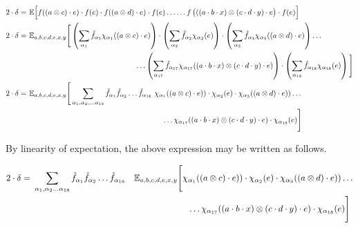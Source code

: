 \documentclass[11pt]{article}
\newcommand{\eat}[1]{}
\begin{document}
\begin{align*}
  2 \cdot \delta = &\ \mathbb{E}\Big[ f((a\otimes c) \cdot e) \cdot f(e) \cdot f((a \otimes d) \cdot e) \cdot f(e) \ldots \ldots  \eat{\\ & \ldots  f\left(\left((a \cdot b \cdot x) \otimes c\right) \cdot e\right) \cdot f(e) \cdot f\left(((a \cdot b \cdot x) \otimes d \cdot e)\right) \cdot f(e) \cdot} f\left(((a \cdot b \cdot x) \otimes (c \cdot d \cdot y) \cdot e\right) \cdot f(e) \Big]\\
  2 \cdot \delta = & \ \mathbb{E}_{a,b,c,d,e,x,y}\Bigg[ \left(\sum_{\alpha_1} \hat{f}_{\alpha_1}\chi_{\alpha_1}((a \otimes c) \cdot e) \right) \cdot \left(\sum_{\alpha_2}\hat{f}_{\alpha_2} \chi_{\alpha_2}(e) \right) \cdot \left(\sum_{\alpha_3} \hat{f}_{\alpha_3}\chi_{\alpha_3}((a \otimes d) \cdot e) \right) \ldots \\ & \hspace*{2in}\ldots \left(\sum_{\alpha_{17}} \hat{f}_{\alpha_{17}}\chi_{\alpha_{17}}((a \cdot b \cdot x) \otimes (c \cdot d \cdot y) \cdot e)\right) \cdot \left(\sum_{\alpha_{18}}\hat{f}_{\alpha_{18}} \chi_{\alpha_{18}}(e) \right)\Bigg]\\
  2 \cdot \delta = & \ \mathbb{E}_{a,b,c,d,e,x,y}\Bigg[\sum_{\alpha_1, \alpha_2, \ldots \alpha_{18}} \hat{f}_{\alpha_1} \hat{f}_{\alpha_2} \ldots \hat{f}_{\alpha_{18}} \ \chi_{\alpha_1}((a \otimes c) \cdot e)) \cdot \chi_{\alpha_2}(e) \cdot \chi_{\alpha_3}((a \otimes d) \cdot e)) \ldots \\ &  \hspace*{2.5in} \ldots  \chi_{\alpha_{17}}((a \cdot b \cdot x) \otimes (c \cdot d \cdot y) \cdot e) \cdot \chi_{\alpha_{18}}(e) \Bigg] 
\end{align*}

\noindent By linearity of expectation, the above expression may be written as follows.

\begin{align*}
  2 \cdot \delta = & \ \sum_{\alpha_1, \alpha_2 \ldots \alpha_{18}} \hat{f}_{\alpha_1}\hat{f}_{\alpha_2} \ldots \hat{f}_{\alpha_{18}}\ \ \ \mathbb{E}_{a,b,c,d,e,x,y}\Bigg[\chi_{\alpha_1}((a \otimes c) \cdot e)) \cdot \chi_{\alpha_2}(e) \cdot \chi_{\alpha_3}((a \otimes d) \cdot e)) \ldots \\ & \hspace*{2.5in} \ldots  \chi_{\alpha_{17}}((a \cdot b \cdot x) \otimes (c \cdot d \cdot y) \cdot e) \cdot \chi_{\alpha_{18}}(e) \Bigg]
\end{align*}
\end{document}
